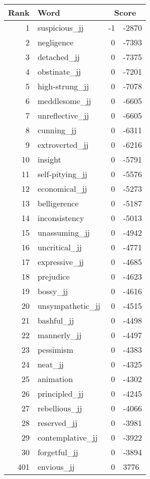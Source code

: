 \begin{longtable}[!htbp]{| rlr@{.}l |}
    \hline
    \textbf{Rank} & \textbf{Word} & \multicolumn{2}{c|}{\textbf{Score}} \\
    \hline
    \endhead
    1 & suspicious\_jj & -1 & -2870 \\
    2 & negligence & 0 & -7393 \\
    3 & detached\_jj & 0 & -7375 \\
    4 & obstinate\_jj & 0 & -7201 \\
    5 & high-strung\_jj & 0 & -7078 \\
    6 & meddlesome\_jj & 0 & -6605 \\
    7 & unreflective\_jj & 0 & -6605 \\
    8 & cunning\_jj & 0 & -6311 \\
    9 & extroverted\_jj & 0 & -6216 \\
    10 & insight & 0 & -5791 \\
    11 & self-pitying\_jj & 0 & -5576 \\
    12 & economical\_jj & 0 & -5273 \\
    13 & belligerence & 0 & -5187 \\
    14 & inconsistency & 0 & -5013 \\
    15 & unassuming\_jj & 0 & -4942 \\
    16 & uncritical\_jj & 0 & -4771 \\
    17 & expressive\_jj & 0 & -4685 \\
    18 & prejudice & 0 & -4623 \\
    19 & bossy\_jj & 0 & -4616 \\
    20 & unsympathetic\_jj & 0 & -4515 \\
    21 & bashful\_jj & 0 & -4498 \\
    22 & mannerly\_jj & 0 & -4497 \\
    23 & pessimism & 0 & -4383 \\
    24 & neat\_jj & 0 & -4325 \\
    25 & animation & 0 & -4302 \\
    26 & principled\_jj & 0 & -4245 \\
    27 & rebellious\_jj & 0 & -4066 \\
    28 & reserved\_jj & 0 & -3981 \\
    29 & contemplative\_jj & 0 & -3922 \\
    30 & forgetful\_jj & 0 & -3894 \\
    401 & envious\_jj & 0 & 3776 \\

\end{longtable}
